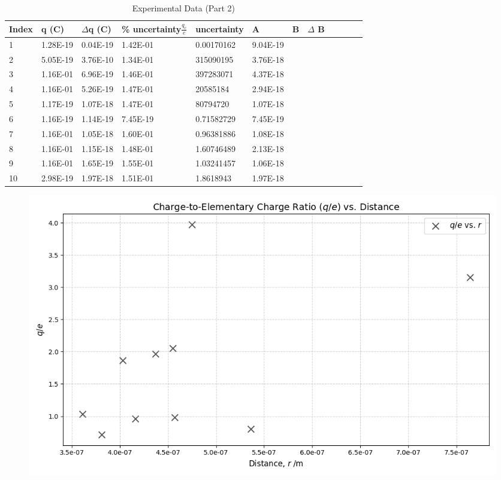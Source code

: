 \documentclass{article}
\begin{document}
\begin{table}[h]
\centering
\caption{Experimental Data (Part 2)}
\label{tab:data_part2}
\begin{tabular}{llllllllllll}
\toprule
\textbf{Index} & \textbf{q (\unit{C})}  & \textbf{$\Delta$q (\unit{C})} & \textbf{\% uncertainty}\textbf{$\frac{q_c}{e}$} & \textbf{uncertainty} & \textbf{A} & \textbf{B} & \textbf{$\Delta$ B} \\
\midrule
1  & 1.28E-19 & 0.04E-19 & 1.42E-01 & 0.00170162 & 9.04E-19 \\
2  & 5.05E-19 & 3.76E-10 & 1.34E-01 & 315090195  & 3.76E-18 \\
3  & 1.16E-01 & 6.96E-19 & 1.46E-01 & 397283071  & 4.37E-18 \\
4  & 1.16E-01 & 5.26E-19 & 1.47E-01 & 20585184   & 2.94E-18 \\
5  & 1.17E-19 & 1.07E-18 & 1.47E-01 & 80794720   & 1.07E-18 \\
6  & 1.16E-19 & 1.14E-19 & 7.45E-19 & 0.71582729 & 7.45E-19 \\
7  & 1.16E-01 & 1.05E-18 & 1.60E-01 & 0.96381886 & 1.08E-18 \\
8  & 1.16E-01 & 1.15E-18 & 1.48E-01 & 1.60746489 & 2.13E-18 \\
9  & 1.16E-01 & 1.65E-19 & 1.55E-01 & 1.03241457 & 1.06E-18 \\
10 & 2.98E-19 & 1.97E-18 & 1.51E-01 & 1.8618943  & 1.97E-18 \\
\bottomrule
\end{tabular}
\end{table}


\begin{figure}[H]
    \centering
    \includegraphics[width=1\linewidth]{Figure_1.png}
    \label{fig:3}
\end{figure}
\end{document}
